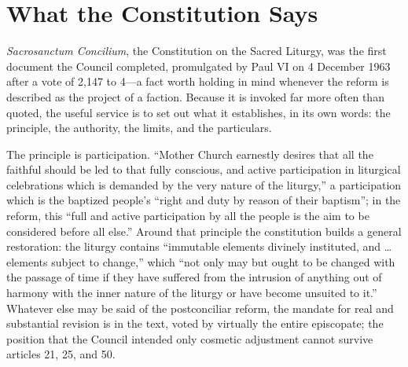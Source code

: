 \section{What the Constitution Says}

\emph{Sacrosanctum Concilium}, the Constitution on the Sacred Liturgy, was the first document the Council completed, promulgated by Paul VI on 4 December 1963 after a vote of 2,147 to 4---a fact worth holding in mind whenever the reform is described as the project of a faction. Because it is invoked far more often than quoted, the useful service is to set out what it establishes, in its own words: the principle, the authority, the limits, and the particulars.

The principle is participation. ``Mother Church earnestly desires that all the faithful should be led to that fully conscious, and active participation in liturgical celebrations which is demanded by the very nature of the liturgy,'' a participation which is the baptized people's ``right and duty by reason of their baptism''; in the reform, this ``full and active participation by all the people is the aim to be considered before all else.'' Around that principle the constitution builds a general restoration: the liturgy contains ``immutable elements divinely instituted, and \ldots{} elements subject to change,'' which ``not only may but ought to be changed with the passage of time if they have suffered from the intrusion of anything out of harmony with the inner nature of the liturgy or have become unsuited to it.'' Whatever else may be said of the postconciliar reform, the mandate for real and substantial revision is in the text, voted by virtually the entire episcopate; the position that the Council intended only cosmetic adjustment cannot survive articles 21, 25, and 50.

